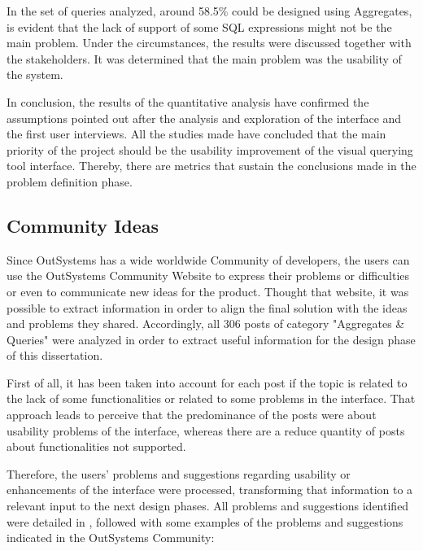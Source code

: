 In the set of queries analyzed, around 58.5\% could be designed using Aggregates, is evident that the lack of support of some \gls{SQL} expressions might not be the main problem. Under the circumstances, the results were discussed together with the stakeholders. It was determined that the main problem was the usability of the system. 

In conclusion, the results of the quantitative analysis have confirmed the assumptions pointed out after the analysis and exploration of the interface and the first user interviews. All the studies made have concluded that the main priority of the project should be the usability improvement of the visual querying tool interface. Thereby, there are metrics that sustain the conclusions made in the problem definition phase.

\subsection{Community Ideas}
\label{subsec:community_ideas}

Since OutSystems has a wide worldwide Community of developers, the users can use the OutSystems Community Website \cite{outsystems_community} to express their problems or difficulties or even to communicate new ideas for the product. Thought that website, it was possible to extract information in order to align the final solution with the ideas and problems they shared. Accordingly, all 306 posts of category "Aggregates \& Queries" were analyzed in order to extract useful information for the design phase of this dissertation.

First of all, it has been taken into account for each post if the topic is related to the lack of some functionalities or related to some problems in the interface. That approach leads to perceive that the predominance of the posts were about usability problems of the interface, whereas there are a reduce quantity of posts about functionalities not supported.

Therefore, the users’ problems and suggestions regarding usability or enhancements of the interface were processed, transforming that information to a relevant input to the next design phases. All problems and suggestions identified were detailed in , followed with some examples of the problems and suggestions indicated in the OutSystems Community:

